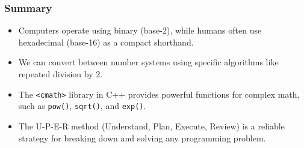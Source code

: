 \documentclass{beamer}
\begin{document}
\begin{frame}
\frametitle{Summary}
\begin{itemize}
    \item Computers operate using \alert{binary} (base-2), while humans often use \alert{hexadecimal} (base-16) as a compact shorthand.
    \item We can convert between number systems using specific algorithms like \alert{repeated division by 2}.
    \item The \texttt{<cmath>} library in C++ provides powerful functions for complex math, such as \texttt{pow()}, \texttt{sqrt()}, and \texttt{exp()}.
    \item The \alert{U-P-E-R method} (Understand, Plan, Execute, Review) is a reliable strategy for breaking down and solving any programming problem.
\end{itemize}
\end{frame}
\end{document}
